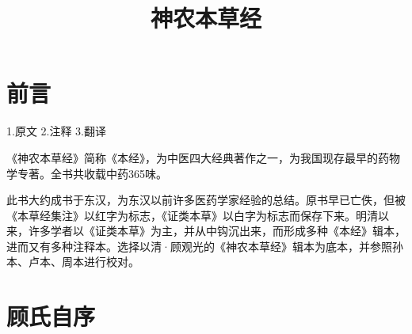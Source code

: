 \documentclass[12pt,UTF8]{ctexbook}
\title{\heiti\zihao{0} 神农本草经}
\author{}
\date{}
\begin{document}
	
\maketitle
\tableofcontents
	
\frontmatter

\chapter{前言}
1.原文
2.注释
3.翻译

《神农本草经》简称《本经》，为中医四大经典著作之一，为我国现存最早的药物学专著。全书共收载中药365味。

此书大约成书于东汉，为东汉以前许多医药学家经验的总结。原书早已亡佚，但被《本草经集注》以红字为标志，《证类本草》以白字为标志而保存下来。明清以来，许多学者以《证类本草》为主，并从中钩沉出来，而形成多种《本经》辑本，进而又有多种注释本。选择以清·顾观光的《神农本草经》辑本为底本，并参照孙本、卢本、周本进行校对。

\chapter{顾氏自序}
\end{document}
